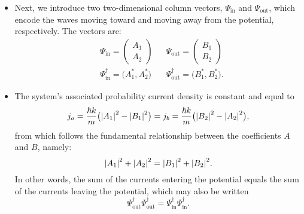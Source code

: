 \documentclass[11pt, a4paper]{article}
\begin{document}
\begin{itemize}
    \item Next, we introduce two two-dimensional column vectors, $ \Psi_{\text{in}} $ and $ \Psi_{\text{out}} $, which encode the waves moving toward and moving away from the potential, respectively. The vectors are:
    \begin{align*}
        & \Psi_{\text{in}} = 
        \begin{pmatrix}
            A_{1}\\
            A_{2}
        \end{pmatrix}
        && \Psi_{\text{out}} = 
        \begin{pmatrix}
            B_{1} \\
            B_{2}
        \end{pmatrix}\\
        & \Psi_{\text{in}}^{\dagger} = \big( A_{1}^{*}, A_{2}^{*} \big)
        && \Psi_{\text{out}}^{\dagger} = \big( B_{1}^{*}, B_{2}^{*} \big).
    \end{align*}

    \item The system's associated probability current density is constant and equal to
    \begin{equation*}
        j_{a} = \frac{\hbar k}{m} \big( \abs{A_{1}}^{2} - \abs{B_{1}}^{2} \big) = j_{b} = \frac{\hbar k}{m} \big( \abs{B_{2}}^{2} - \abs{A_{2}}^{2} \big),
    \end{equation*}
    from which follows the fundamental relationship between the coefficients $ A $ and $ B $, namely:
    \begin{equation*}
        \abs{A_{1}}^{2} + \abs{A_{2}}^{2} = \abs{B_{1}}^{2} + \abs{B_{2}}^{2}.
    \end{equation*}
    In other words, the sum of the currents entering the potential equals the sum of the currents leaving the potential, which may also be written
    \begin{equation*}
        \Psi_{\text{out}}^{\dagger} \Psi_{\text{out}}^{\dagger} = \Psi_{\text{in}}^{\dagger} \Psi_{\text{in}}^{\dagger}.
    \end{equation*}
    
\end{itemize}
\end{document}
